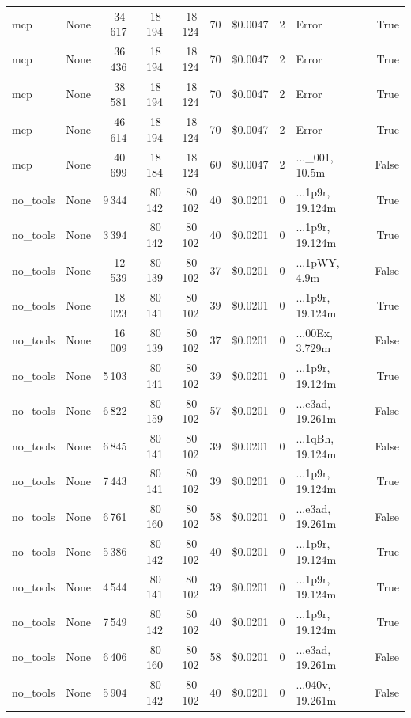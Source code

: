 \documentclass[a4paper,11pt]{article}
\begin{document}
\begin{table}[H]
{\begin{tabular}{l r r r r r r r l r}
mcp & None & 34\,617 & 18\,194 & 18\,124 & 70 & \$0.0047 & 2 & Error & True \\
mcp & None & 36\,436 & 18\,194 & 18\,124 & 70 & \$0.0047 & 2 & Error & True \\
mcp & None & 38\,581 & 18\,194 & 18\,124 & 70 & \$0.0047 & 2 & Error & True \\
mcp & None & 46\,614 & 18\,194 & 18\,124 & 70 & \$0.0047 & 2 & Error & True \\
mcp & None & 40\,699 & 18\,184 & 18\,124 & 60 & \$0.0047 & 2 & ...\_001, 10.5m & False \\
\midrule
no\_tools & None & 9\,344 & 80\,142 & 80\,102 & 40 & \$0.0201 & 0 & ...1p9r, 19.124m & True \\
no\_tools & None & 3\,394 & 80\,142 & 80\,102 & 40 & \$0.0201 & 0 & ...1p9r, 19.124m & True \\
no\_tools & None & 12\,539 & 80\,139 & 80\,102 & 37 & \$0.0201 & 0 & ...1pWY, 4.9m & False \\
no\_tools & None & 18\,023 & 80\,141 & 80\,102 & 39 & \$0.0201 & 0 & ...1p9r, 19.124m & True \\
no\_tools & None & 16\,009 & 80\,139 & 80\,102 & 37 & \$0.0201 & 0 & ...00Ex, 3.729m & False \\
no\_tools & None & 5\,103 & 80\,141 & 80\,102 & 39 & \$0.0201 & 0 & ...1p9r, 19.124m & True \\
no\_tools & None & 6\,822 & 80\,159 & 80\,102 & 57 & \$0.0201 & 0 & ...e3ad, 19.261m & False \\
no\_tools & None & 6\,845 & 80\,141 & 80\,102 & 39 & \$0.0201 & 0 & ...1qBh, 19.124m & False \\
no\_tools & None & 7\,443 & 80\,141 & 80\,102 & 39 & \$0.0201 & 0 & ...1p9r, 19.124m & True \\
no\_tools & None & 6\,761 & 80\,160 & 80\,102 & 58 & \$0.0201 & 0 & ...e3ad, 19.261m & False \\
no\_tools & None & 5\,386 & 80\,142 & 80\,102 & 40 & \$0.0201 & 0 & ...1p9r, 19.124m & True \\
no\_tools & None & 4\,544 & 80\,141 & 80\,102 & 39 & \$0.0201 & 0 & ...1p9r, 19.124m & True \\
no\_tools & None & 7\,549 & 80\,142 & 80\,102 & 40 & \$0.0201 & 0 & ...1p9r, 19.124m & True \\
no\_tools & None & 6\,406 & 80\,160 & 80\,102 & 58 & \$0.0201 & 0 & ...e3ad, 19.261m & False \\
no\_tools & None & 5\,904 & 80\,142 & 80\,102 & 40 & \$0.0201 & 0 & ...040v, 19.261m & False \\

\end{tabular}}
\end{table}
\end{document}
